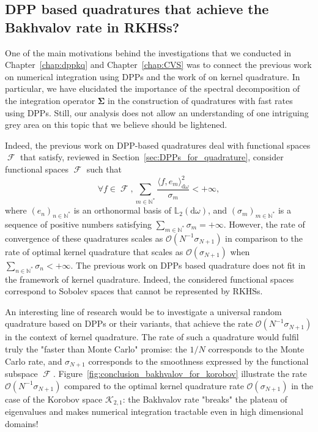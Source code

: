 \documentclass[twoside,11pt]{book}
\numberwithin{theorem}{chapter}
\numberwithin{definition}{chapter}
\numberwithin{proposition}{chapter}
\numberwithin{corollary}{chapter}
\numberwithin{example}{chapter}
\numberwithin{lemma}{chapter}
\numberwithin{assumption}{chapter}
\numberwithin{equation}{chapter}
\numberwithin{figure}{chapter}
\DeclareMathOperator{\F}{\mathcal{F}}
\DeclareMathOperator{\X}{\mathcal{X}}
\begin{document}
\subsection{DPP based quadratures that achieve the Bakhvalov rate in RKHSs?}\label{sec:bakhvalov}

One of the main motivations behind the investigations that we conducted in Chapter~\ref{chap:dppkq} and Chapter~\ref{chap:CVS} was to connect the previous work on numerical integration using DPPs
\citep*{BaHa16} and the work of \parencite{Bac17} on kernel quadrature. In particular, we have elucidated the importance of the spectral decomposition of the integration operator $\bm{\Sigma}$ in the construction of quadratures with fast rates using DPPs. Still, our analysis does not allow an understanding of one intriguing grey area
on this topic that we believe should be lightened.

Indeed, the previous work on DPP-based quadratures deal with functional spaces $\F$ that satisfy, reviewed in Section~\ref{sec:DPPs_for_quadrature}, consider functional spaces $\F$ such that  
\begin{equation}
\forall f \in \F, \sum\limits_{m \in \mathbb{N}^{*}} \frac{\langle f,e_{m} \rangle_{\mathrm{d}\omega}^{2}}{\sigma_m} <+\infty,
\end{equation}
where $(e_{n})_{n \in \mathbb{N}^{*}}$ is an orthonormal basis of $\mathbb{L}_{2}(\mathrm{d}\omega)$, and $(\sigma_{m})_{m \in \mathbb{N}^{*}}$ is a sequence of positive numbers satisfying $\sum_{m \in \mathbb{N}^{*}} \sigma_m =+\infty$.
However, the rate of convergence of these quadratures scales as $\mathcal{O}(N^{-1}\sigma_{N+1})$ in comparison to the rate of optimal kernel quadrature that scales as $\mathcal{O}(\sigma_{N+1})$ when $\sum_{n \in \mathbb{N}^{*}} \sigma_{n} < +\infty$. The previous work on DPPs based quadrature does not fit in the framework of kernel quadrature. Indeed, the considered functional spaces correspond to Sobolev spaces that cannot be represented by RKHSs. 


An interesting line of research would be to investigate a universal random quadrature based on DPPs or their variants, that achieve the rate $\mathcal{O}(N^{-1}\sigma_{N+1})$ in the context of kernel quadrature.
 The rate of such a quadrature would fulfil truly the "faster than Monte Carlo" promise: the $1/N$ corresponds to the Monte Carlo rate, and $\sigma_{N+1}$ corresponds to the smoothness expressed by the functional subspace $\F$. Figure~\ref{fig:conclusion_bakhvalov_for_korobov} illustrate the rate $\mathcal{O}(N^{-1}\sigma_{N+1})$ compared to the optimal kernel quadrature rate $\mathcal{O}(\sigma_{N+1})$ in the case of the Korobov space $\mathcal{K}_{2,1}$: the Bakhvalov rate "breaks" the plateau of eigenvalues and makes numerical integration tractable even in high dimensional domains! 
\end{document}
